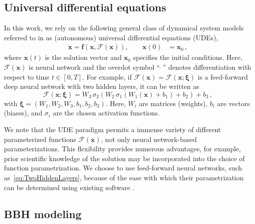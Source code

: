 \documentclass[ reprint,
nofootinbib,
 amsmath,amssymb,
 aps,
]{revtex4-2}
\begin{document}
\subsection{Universal differential equations} \label{sec:universal_differential_equations}

In this work, we rely on the following general class of dynamical system models referred to in \cite{rackauckas2020universal} as (autonomous) universal differential equations (UDEs),
\begin{align}
\label{eq:UDE}
	\dot{\mathbf{x}}
	=
			\mathbf{f}(\mathbf{x},\mathcal{F}(\mathbf{x}))
	,
	\qquad
	\mathbf{x}(0) &= \mathbf{x}_0
		\,,
\end{align}
where $\mathbf{x}(t)$ is the solution vector and $\mathbf{x}_0$ specifies the initial conditions.
Here, $\mathcal{F}(\mathbf{x})$ is neural network and the overdot symbol ``$~\dot{}~$'' denotes differentiation with respect to time $t \in [0,T]$.
For example, if $\mathcal{F}(\mathbf{x}) = \mathcal{F}(\mathbf{x};\bm{\xi})$ is a feed-forward deep neural network with two hidden layers, it can be written as
\begin{equation}
\label{eq:TwoHiddenLayers}
	\mathcal{F}(\mathbf{x};\bm{\xi})
	=
	W_3\,\sigma_2(W_2\,\sigma_1(W_1(\mathbf{x}) + b_1)+b_2)+b_3 \,,
\end{equation}
with $\bm{\xi} = (W_1,W_2,W_3,b_1,b_2,b_3)$.
Here, $W_i$ are matrices (weights), $b_i$ are vectors (biases), and $\sigma_i$ are the chosen activation functions.

We note that the UDE paradigm permits a immense variety of different parameterized functions $\mathcal{F}(\mathbf{x})$, not only neural network-based parameterizations.
This flexibility provides numerous advantages, for example, prior scientific knowledge of the solution may be incorporated into the choice of function parametrization.
We choose to use feed-forward neural networks, such as~\cref{eq:TwoHiddenLayers}, because of the ease with which their parametrization can be determined using existing software \cite{rackauckas2020universal}.



\subsection{BBH modeling} \label{sec:physically_motivated_models}
\end{document}
